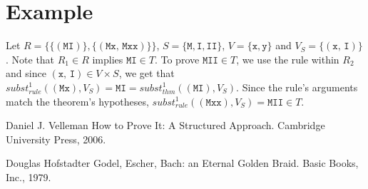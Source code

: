 \documentclass{article}
\begin{document}
\section{Example}

Let $R = \{ \{ (\texttt{MI}) \}, \{ (\texttt{Mx, Mxx}) \} \}$, $S = \{ \texttt{M}, \texttt{I}, \texttt{II} \}$, $V = \{ \texttt{x}, \texttt{y} \}$ and $V_S = \{ (\texttt{x, I}) \}$. Note that $R_1 \in R$ implies $\texttt{MI} \in T$. To prove $\texttt{MII} \in T$, we use the rule within $R_2$ and since $(\texttt{x, I}) \in V \times S$, we get that $subst_{rule}^1((\texttt{Mx}), V_S) = \texttt{MI} = subst_{thm}^1((\texttt{MI}), V_S)$. Since the rule's arguments match the theorem's hypotheses, $subst_{rule}^1((\texttt{Mxx}), V_S) = \texttt{MII} \in T$.

\begin{thebibliography}{1}

Daniel J. Velleman
\newblock How to Prove It: A Structured Approach.
\newblock Cambridge University Press, 2006.

Douglas Hofstadter
\newblock Godel, Escher, Bach: an Eternal Golden Braid.
\newblock Basic Books, Inc., 1979.

\end{thebibliography}
\end{document}
